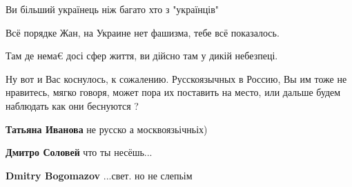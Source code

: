 \begin{itemize}
Ви більший українець ніж багато хто з "українців"

 
Всё порядке Жан, на Украине нет фашизма, тебе всё показалось.

 
Там де нема€ досі сфер життя, ви дійсно там у дикій небезпеці.

 

Ну вот и Вас коснулось, к сожалению. Русскоязычных в Россию, Вы им тоже не
нравитесь, мягко говоря, может пора их поставить на место, или дальше будем
наблюдать как они беснуются ?

\begin{itemize}
 
\textbf{Татьяна Иванова} не русско а москвоязьічньіх)

 
\textbf{Дмитро Соловей} что ты несёшь...

 
\textbf{Dmitry Bogomazov} ...свет. но не слепьім
\end{itemize}


\end{itemize}
